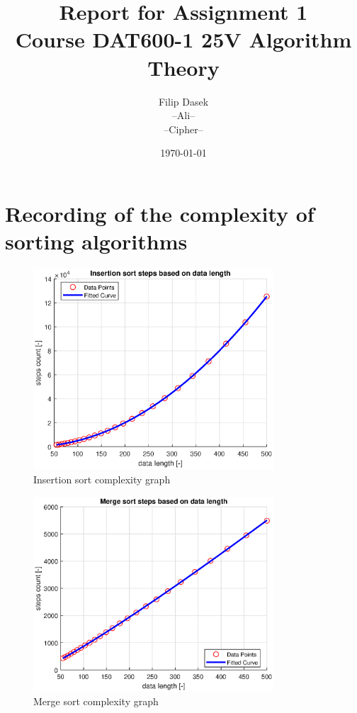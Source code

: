 \documentclass[oneside]{article}
\title{Report for Assignment 1\\Course DAT600-1 25V Algorithm Theory}
\author{Filip Dasek\\--Ali--\\--Cipher--}
\date{\today}
\begin{document}
\maketitle
{}
\newpage
{}

\section{Recording of the complexity of sorting algorithms}

\begin{figure}[H]
    \centering
    \includegraphics[width = 0.8\textwidth]{is_count_figure.eps}
    \caption{Insertion sort complexity graph}
    \label{fig:is_count}
\end{figure}

\begin{figure}[H]
    \centering
    \includegraphics[width = 0.8\textwidth]{ms_count_figure.eps}
    \caption{Merge sort complexity graph}
    \label{fig:ms_count}
\end{figure}
\end{document}
